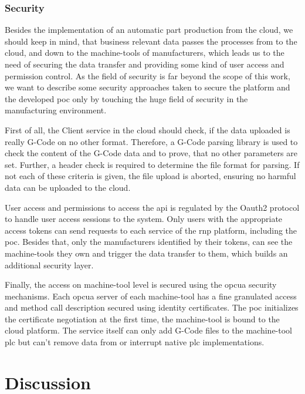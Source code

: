 \documentclass[
a4paper,
twoside,
headsepline,
cleardoublepage=empty,
parskip=half,
draft=false
]{scrbook}
\begin{document}
			\subsection{Security} \label{subsec:security}

				Besides the implementation of an automatic part production from the cloud, we should keep in mind, that business relevant data passes the processes from to the cloud, and down to the machine-tools of manufacturers, which leads us to the need of securing the data transfer and providing some kind of user access and permission control. As the field of security is far beyond the scope of this work, we want to describe some security approaches taken to secure the platform and the developed \gls{poc} only by touching the huge field of security in the manufacturing environment.

				First of all, the Client service in the cloud should check, if the data uploaded is really G-Code on no other format. Therefore, a G-Code parsing library is used to check the content of the G-Code data and to prove, that no other parameters are set. Further, a header check is required to determine the file format for parsing. If not each of these criteria is given, the file upload is aborted, ensuring no harmful data can be uploaded to the cloud.

				User access and permissions to access the \gls{api} is regulated by the Oauth2 protocol to handle user access sessions to the system. Only users with the appropriate access tokens can send requests to each service of the \gls{rnp} platform, including the \gls{poc}. Besides that, only the manufacturers identified by their tokens, can see the machine-tools they own and trigger the data transfer to them, which builds an additional security layer.

				Finally, the access on machine-tool level is secured using the \gls{opcua} security mechanisms. Each \gls{opcua} server of each machine-tool has a fine granulated access and method call description secured using identity certificates. The \gls{poc} initializes the certificate negotiation at the first time, the machine-tool is bound to the cloud platform. The service itself can only add G-Code files to the machine-tool \gls{plc} but can't remove data from or interrupt native \gls{plc} implementations.

	\chapter{Discussion} \label{ch:discusion}
\end{document}

